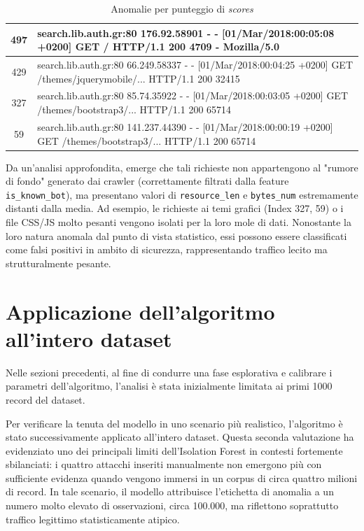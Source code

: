 \begin{table}[H]
{\begin{tabular}{|c|p{20cm}|}
                  497            & {\ttfamily search.lib.auth.gr:80 176.92.58901 - - [01/Mar/2018:00:05:08 +0200] GET / HTTP/1.1 200 4709 - Mozilla/5.0}                                       \\ \hline
                  429            & {\ttfamily search.lib.auth.gr:80 66.249.58337 - - [01/Mar/2018:00:04:25 +0200] GET /themes/jquerymobile/... HTTP/1.1 200 32415}                             \\ \hline
                  327            & {\ttfamily search.lib.auth.gr:80 85.74.35922 - - [01/Mar/2018:00:03:05 +0200] GET /themes/bootstrap3/... HTTP/1.1 200 65714}                                \\ \hline
                  59             & {\ttfamily search.lib.auth.gr:80 141.237.44390 - - [01/Mar/2018:00:00:19 +0200] GET /themes/bootstrap3/... HTTP/1.1 200 65714}                              \\ \hline
            \end{tabular}
      }
      \caption{Anomalie per punteggio di \emph{scores}}
\end{table}


Da un'analisi approfondita, emerge che tali richieste non appartengono al "rumore di fondo" generato dai crawler (correttamente filtrati dalla feature \\ \texttt{is\_known\_bot}), ma presentano valori di \texttt{resource\_len} e \texttt{bytes\_num} estremamente distanti dalla media. Ad esempio, le richieste ai temi grafici (Index 327, 59) o i file CSS/JS molto pesanti vengono isolati per la loro mole di dati. Nonostante la loro natura anomala dal punto di vista statistico, essi possono essere classificati come falsi positivi in ambito di sicurezza, rappresentando traffico lecito ma strutturalmente pesante.

\section{Applicazione dell'algoritmo all'intero dataset}

Nelle sezioni precedenti, al fine di condurre una fase esplorativa e calibrare i parametri dell’algoritmo, l’analisi è stata inizialmente limitata ai primi 1000 record del dataset.

Per verificare la tenuta del modello in uno scenario più realistico, l’algoritmo è stato successivamente applicato all’intero dataset. Questa seconda valutazione ha evidenziato uno dei principali limiti dell’Isolation Forest in contesti fortemente sbilanciati: i quattro attacchi inseriti manualmente non emergono più con sufficiente evidenza quando vengono immersi in un corpus di circa quattro milioni di record. In tale scenario, il modello attribuisce l’etichetta di anomalia a un numero molto elevato di osservazioni, circa 100.000, ma riflettono soprattutto traffico legittimo statisticamente atipico.

